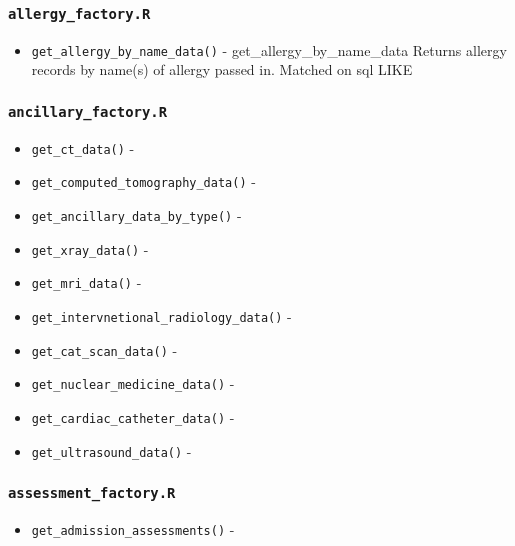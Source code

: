 \documentclass[
]{book}
\providecommand{\tightlist}{%
  \setlength{\itemsep}{0pt}\setlength{\parskip}{0pt}}
\begin{document}
\hypertarget{allergy_factory.r}{%
\subsubsection{\texorpdfstring{\texttt{allergy\_factory.R}}{allergy\_factory.R}}\label{allergy_factory.r}}

\begin{itemize}
\tightlist
\item
  \texttt{get\_allergy\_by\_name\_data()} - get\_allergy\_by\_name\_data Returns allergy records by name(s) of allergy passed in. Matched on sql LIKE
\end{itemize}

\hypertarget{ancillary_factory.r}{%
\subsubsection{\texorpdfstring{\texttt{ancillary\_factory.R}}{ancillary\_factory.R}}\label{ancillary_factory.r}}

\begin{itemize}
\tightlist
\item
  \texttt{get\_ct\_data()} -
\item
  \texttt{get\_computed\_tomography\_data()} -
\item
  \texttt{get\_ancillary\_data\_by\_type()} -
\item
  \texttt{get\_xray\_data()} -
\item
  \texttt{get\_mri\_data()} -
\item
  \texttt{get\_intervnetional\_radiology\_data()} -
\item
  \texttt{get\_cat\_scan\_data()} -
\item
  \texttt{get\_nuclear\_medicine\_data()} -
\item
  \texttt{get\_cardiac\_catheter\_data()} -
\item
  \texttt{get\_ultrasound\_data()} -
\end{itemize}

\hypertarget{assessment_factory.r}{%
\subsubsection{\texorpdfstring{\texttt{assessment\_factory.R}}{assessment\_factory.R}}\label{assessment_factory.r}}

\begin{itemize}
\tightlist
\item
  \texttt{get\_admission\_assessments()} -
\end{itemize}
\end{document}
